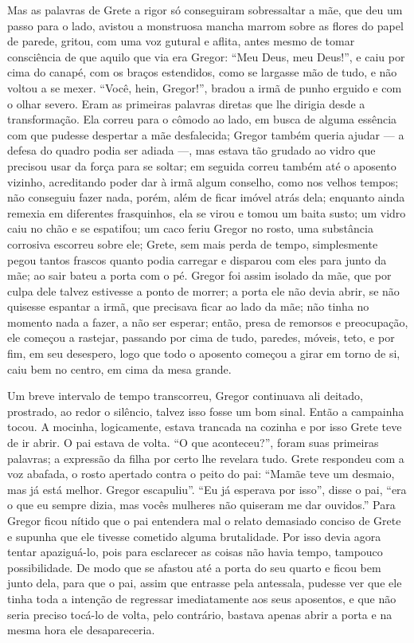 Mas as palavras de Grete a rigor só conseguiram sobressaltar a mãe, que
deu um passo para o lado, avistou a monstruosa mancha marrom sobre as
flores do papel de parede, gritou, com uma voz gutural e aflita, antes
mesmo de tomar consciência de que aquilo que via era Gregor: “Meu Deus,
meu Deus!”, e caiu por cima do canapé, com os braços estendidos, como se
largasse mão de tudo, e não voltou a se mexer. “Você, hein, Gregor!”,
bradou a irmã de punho erguido e com o olhar severo. Eram as primeiras
palavras diretas que lhe dirigia desde a transformação. Ela correu para o
cômodo ao lado, em busca de alguma essência com que pudesse despertar a
mãe desfalecida; Gregor também queria ajudar --- a defesa do quadro podia
ser adiada ---, mas estava tão grudado ao vidro que precisou usar da força
para se soltar; em seguida correu também até o aposento vizinho,
acreditando poder dar à irmã algum conselho, como nos velhos tempos; não
conseguiu fazer nada, porém, além de ficar imóvel atrás dela; enquanto
ainda remexia em diferentes frasquinhos, ela se virou e tomou um baita
susto; um vidro caiu no chão e se espatifou; um caco feriu Gregor no
rosto, uma substância corrosiva escorreu sobre ele; Grete, sem mais perda
de tempo, simplesmente pegou tantos frascos quanto podia carregar e
disparou com eles para junto da mãe; ao sair bateu a porta com o pé.
Gregor foi assim isolado da mãe, que por culpa dele talvez estivesse a
ponto de morrer; a porta ele não devia abrir, se não quisesse espantar a
irmã, que precisava ficar ao lado da mãe; não tinha no momento nada a
fazer, a não ser esperar; então, presa de remorsos e preocupação, ele
começou a rastejar, passando por cima de tudo, paredes, móveis, teto, e
por fim, em seu desespero, logo que todo o aposento começou a girar em
torno de si, caiu bem no centro, em cima da mesa grande.

Um breve intervalo de tempo transcorreu, Gregor continuava ali deitado,
prostrado, ao redor o silêncio, talvez isso fosse um bom sinal. Então a
campainha tocou. A mocinha, logicamente, estava trancada na cozinha e por
isso Grete teve de ir abrir. O pai estava de volta. “O que aconteceu?”,
foram suas primeiras palavras; a expressão da filha por certo lhe revelara
tudo. Grete respondeu com a voz abafada, o rosto apertado contra o peito
do pai: “Mamãe teve um desmaio, mas já está melhor. Gregor escapuliu”. “Eu
já esperava por isso”, disse o pai, “era o que eu sempre dizia, mas vocês
mulheres não quiseram me dar ouvidos.” Para Gregor ficou nítido que o pai
entendera mal o relato demasiado conciso de Grete e supunha que ele
tivesse cometido alguma brutalidade. Por isso devia agora tentar
apaziguá-lo, pois para esclarecer as coisas não havia tempo, tampouco
possibilidade. De modo que se afastou até a porta do seu quarto e ficou
bem junto dela, para que o pai, assim que entrasse pela antessala, pudesse
ver que ele tinha toda a intenção de regressar imediatamente aos seus
aposentos, e que não seria preciso tocá-lo de volta, pelo contrário,
bastava apenas abrir a porta e na mesma hora ele desapareceria.


